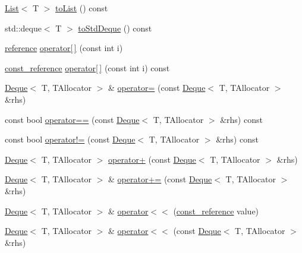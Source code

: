 \begin{DoxyCompactItemize}
\hyperlink{classprism_1_1_list}{List}$<$ T $>$ \hyperlink{classprism_1_1_deque_a7df8a426af257dea3fe759acec3811f7}{to\+List} () const 
\item 
std\+::deque$<$ T $>$ \hyperlink{classprism_1_1_deque_a784590b8cde3bd103fb125c25793c578}{to\+Std\+Deque} () const 
\item 
\hyperlink{classprism_1_1_deque_a035cdb869f46870d62d403d9ff5e3691}{reference} \hyperlink{classprism_1_1_deque_a8ffb93619daf49eddfdeccb4903e61fe}{operator\mbox{[}$\,$\mbox{]}} (const int i)
\item 
\hyperlink{classprism_1_1_deque_affa26df70d5123f79a59386056e920c3}{const\+\_\+reference} \hyperlink{classprism_1_1_deque_a7393a2fb9c8ea2592700274e90263f68}{operator\mbox{[}$\,$\mbox{]}} (const int i) const 
\item 
\hyperlink{classprism_1_1_deque}{Deque}$<$ T, T\+Allocator $>$ \& \hyperlink{classprism_1_1_deque_adbff553ddf93e50faaff25777a19315b}{operator=} (const \hyperlink{classprism_1_1_deque}{Deque}$<$ T, T\+Allocator $>$ \&rhs)
\item 
const bool \hyperlink{classprism_1_1_deque_a45b37db6e9e97285885771ea2bb0f2d6}{operator==} (const \hyperlink{classprism_1_1_deque}{Deque}$<$ T, T\+Allocator $>$ \&rhs) const 
\item 
const bool \hyperlink{classprism_1_1_deque_a53c4b22091aa448ffd1c9da4b9373b73}{operator!=} (const \hyperlink{classprism_1_1_deque}{Deque}$<$ T, T\+Allocator $>$ \&rhs) const 
\item 
\hyperlink{classprism_1_1_deque}{Deque}$<$ T, T\+Allocator $>$ \hyperlink{classprism_1_1_deque_a4094f8cf6188a808247fc71a2f7823fb}{operator+} (const \hyperlink{classprism_1_1_deque}{Deque}$<$ T, T\+Allocator $>$ \&rhs)
\item 
\hyperlink{classprism_1_1_deque}{Deque}$<$ T, T\+Allocator $>$ \& \hyperlink{classprism_1_1_deque_aac89b0d7b999755c3f7032898157c524}{operator+=} (const \hyperlink{classprism_1_1_deque}{Deque}$<$ T, T\+Allocator $>$ \&rhs)
\item 
\hyperlink{classprism_1_1_deque}{Deque}$<$ T, T\+Allocator $>$ \& \hyperlink{classprism_1_1_deque_a8faca1628aeead734466460b5f9d381e}{operator$<$$<$} (\hyperlink{classprism_1_1_deque_affa26df70d5123f79a59386056e920c3}{const\+\_\+reference} value)
\item 
\hyperlink{classprism_1_1_deque}{Deque}$<$ T, T\+Allocator $>$ \& \hyperlink{classprism_1_1_deque_ae5eb565c122f033dbf7d4627ee55163e}{operator$<$$<$} (const \hyperlink{classprism_1_1_deque}{Deque}$<$ T, T\+Allocator $>$ \&rhs)
\end{DoxyCompactItemize}
